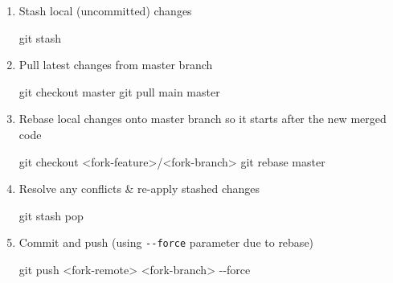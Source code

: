 \documentclass[
]{article}
\newenvironment{Shaded}{}{}
\newcommand{\FunctionTok}[1]{\textcolor[rgb]{0.02,0.16,0.49}{#1}}
\newcommand{\NormalTok}[1]{#1}
\newcommand{\OperatorTok}[1]{\textcolor[rgb]{0.40,0.40,0.40}{#1}}
\begin{document}
\begin{enumerate}
\def\labelenumi{\arabic{enumi}.}
\item
  Stash local (uncommitted) changes

\begin{Shaded}
\begin{Highlighting}[]
   \FunctionTok{git}\NormalTok{ stash}
\end{Highlighting}
\end{Shaded}
\item
  Pull latest changes from master branch

\begin{Shaded}
\begin{Highlighting}[]
   \FunctionTok{git}\NormalTok{ checkout master}
   \FunctionTok{git}\NormalTok{ pull main master}
\end{Highlighting}
\end{Shaded}
\item
  Rebase local changes onto master branch so it starts after the new
  merged code

\begin{Shaded}
\begin{Highlighting}[]
   \FunctionTok{git}\NormalTok{ checkout }\OperatorTok{\textless{}}\NormalTok{fork{-}feature}\OperatorTok{\textgreater{}}\NormalTok{/}\OperatorTok{\textless{}}\NormalTok{fork{-}branch}\OperatorTok{\textgreater{}}
   \FunctionTok{git}\NormalTok{ rebase master}
\end{Highlighting}
\end{Shaded}
\item
  Resolve any conflicts \& re-apply stashed changes

\begin{Shaded}
\begin{Highlighting}[]
   \FunctionTok{git}\NormalTok{ stash pop}
\end{Highlighting}
\end{Shaded}
\item
  Commit and push (using \texttt{-\/-force} parameter due to rebase)

\begin{Shaded}
\begin{Highlighting}[]
   \FunctionTok{git}\NormalTok{ push }\OperatorTok{\textless{}}\NormalTok{fork{-}remote}\OperatorTok{\textgreater{}} \OperatorTok{\textless{}}\NormalTok{fork{-}branch}\OperatorTok{\textgreater{}}\NormalTok{ {-}{-}force}
\end{Highlighting}
\end{Shaded}
\end{enumerate}
\end{document}
